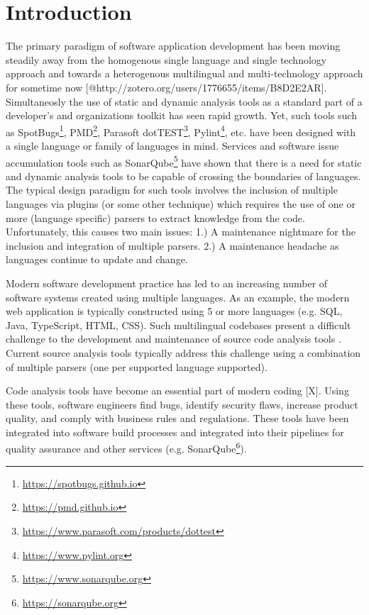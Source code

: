 \documentclass[10pt,nocc]{xrese_report}
\begin{document}
\chapter{Introduction}

The primary paradigm of software application development has been moving steadily away from the homogenous single language and single technology approach and towards a heterogenous multilingual and multi-technology approach for sometime now [@http://zotero.org/users/1776655/items/B8D2E2AR]. Simultaneosly the use of static and dynamic analysis tools as a standard part of a developer's and organizations toolkit has seen rapid growth. Yet, such tools such as SpotBugs\footnote{\url{https://spotbugs.github.io}}, PMD\footnote{\url{https://pmd.github.io}}, Parasoft dotTEST\footnote{\url{https://www.parasoft.com/products/dottest}}, Pylint\footnote{\url{https://www.pylint.org}}, etc. have been designed with a single language or family of languages in mind. Services and software issue accumulation tools such as SonarQube\footnote{\url{https://www.sonarqube.org}} have shown that there is a need for static and dynamic analysis tools to be capable of crossing the boundaries of languages. The typical design paradigm for such tools involves the inclusion of multiple languages via plugins (or some other technique) which requires the use of one or more (language specific) parsers to extract knowledge from the code. Unfortunately, this causes two main issues: 1.) A maintenance nightmare for the inclusion and integration of multiple parsers. 2.) A maintenance headache as languages continue to update and change.

Modern software development practice has led to an increasing number of software systems created using multiple languages. As an example, the modern web application is typically constructed using 5 or more languages (e.g. SQL, Java, TypeScript, HTML, CSS). Such multilingual codebases present a difficult challenge to the development and maintenance of source code analysis tools \cite{mushtaq_multilingual_2017}. Current source analysis tools typically address this challenge using a combination of multiple parsers (one per supported language supported).

Code analysis tools have become an essential part of modern coding [X]. Using these tools, software engineers find bugs, identify security flaws, increase product quality, and comply with business rules and regulations. These tools have been integrated into software build processes and integrated into their pipelines for quality assurance and other services (e.g. SonarQube\texttrademark \footnote{\url{https://sonarqube.org}}).
\end{document}
